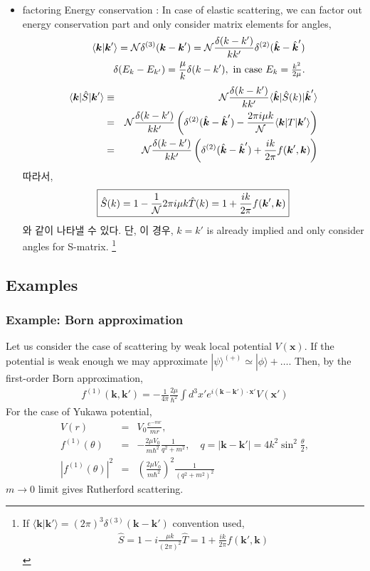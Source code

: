 \documentclass[10pt]{book}
\def\bm{\boldsymbol}
\newcommand{\bea}{\begin{eqnarray}}
\newcommand{\eea}{\end{eqnarray}}
\newcommand{\no}{\nonumber \\}
\def\vk{{\bm k}}
\def\vx{{\bm x}}
\def\la{\langle}
\def\ra{\rangle}
\begin{document}
\begin{itemize}
\item factoring Energy conservation : In case of elastic scattering,
     we can factor out energy conservation part and only consider 
     matrix elements for angles,
\bea
& &\la \vk|\vk'\ra={\cal N}\delta^{(3)}(\vk-\vk')
  ={\cal N}\frac{\delta(k-k')}{k k'}\delta^{(2)}(\hat{\vk}-\hat{\vk}')\no
& &\delta(E_k-E_{k'})=\frac{\mu}{k}\delta(k-k'),
  \mbox{ in case $E_k=\frac{k^2}{2\mu}$.} 
\eea
\bea
\la \vk|\hat{S}|\vk'\ra
&\equiv&  {\cal N}\frac{\delta(k-k')}{k k'}\la\hat{\vk}|\hat{S}(k)|\hat{\vk}'\ra \no
&=&{\cal N}\frac{\delta(k-k')}{k k'}\left(\delta^{(2)}(\hat{\vk}-\hat{\vk}')
   -\frac{2\pi i \mu k}{\cal N} 
   \la \vk| T|\vk'\ra \right) \no
&=&{\cal N}\frac{\delta(k-k')}{k k'}\left(\delta^{(2)}(\hat{\vk}-\hat{\vk}')
   +\frac{i k}{2\pi}  f(\vk',\vk)\right) 
\eea
따라서,
\bea
\boxed{ 
\hat{S}(k)=1-\frac{1}{\cal N}2\pi i \mu k \hat{T}(k)=1+\frac{ik}{2\pi}f(\vk',\vk)
}
\eea
와 같이 나타낼 수 있다. 단, 이 경우, $k=k'$ is already implied and
only consider angles for S-matrix.
\footnote{ 
If $\la \vk|\vk'\ra=(2\pi)^3\delta^{(3)}(\vk-\vk')$
convention used,
\bea
\hat{S}=1- i \frac{\mu k}{(2\pi)^2} \hat{T}
  =1+\frac{ik}{2\pi}f(\vk',\vk)
\eea
}
\end{itemize}

\subsection{Examples}
\subsubsection{Example: Born approximation}
Let us consider the case of scattering by weak local potential $V(\vx)$.
If the potential is weak enough we may approximate $|\psi\ra^{(+)}\simeq |\phi\ra +\dots$.
Then, by the first-order Born approximation,
\bea
f^{(1)}(\vk,\vk')=-\frac{1}{4\pi}\frac{2\mu}{\hbar^2}\int d^3 x' e^{i(\vk-\vk')\cdot\vx'} V(\vx')
\eea 
For the case of Yukawa potential,
\bea
V(r)&=&V_0\frac{e^{-m r}}{m r},\no 
f^{(1)}(\theta)&=& -\frac{2\mu V_0}{m\hbar^2 }\frac{1}{q^2+m^2},\quad
  q=|\vk-\vk'|=4k^2 \sin^2\frac{\theta}{2},\no   
|f^{(1)}(\theta)|^2&=& \left(\frac{2\mu V_0}{m\hbar^2 }\right)^2 \frac{1}{(q^2+m^2)^2}
\eea 
$m\to 0$ limit gives Rutherford scattering.
\end{document}

